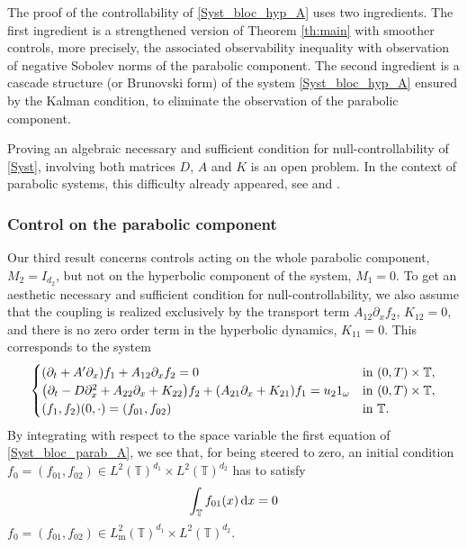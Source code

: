 \documentclass[10pt]{amsart}
\theoremstyle{plain}
\theoremstyle{definition}
\theoremstyle{remark}
\newcommand{\diff}[1][-3]{\ensuremath{\mathop{}\mkern#1mu\mathrm{d}}}
\newcommand{\set}{\mathbb}
\newcommand{\T}{\set{T}}
\newcommand{\m}{{\mathrm m}}
\let\originalleft\left
\let\originalright\right
\renewcommand{\left}{\mathopen{}\mathclose\bgroup\originalleft}
\renewcommand{\right}{\aftergroup\egroup\originalright}
\begin{document}
The proof of the controllability of \eqref{Syst_bloc_hyp_A} uses two ingredients. The first ingredient is a strengthened version of Theorem \ref{th:main} with smoother controls, more precisely, the associated observability inequality with observation of negative Sobolev norms of the parabolic component. The second ingredient is a cascade structure (or Brunovski form) of the system \eqref{Syst_bloc_hyp_A} ensured by the Kalman condition, to eliminate the observation of the parabolic component.

Proving an algebraic necessary and sufficient condition for null-controllability of \eqref{Syst}, involving both matrices $D$, $A$ and $K$ is an open problem.
In the context of parabolic systems, this difficulty already appeared, see
\cite{ammarkhodja_2009} and \cite{duprez_2016a}.

\subsubsection{Control on the parabolic component}

Our third result concerns controls acting on the whole parabolic component, $M_2=I_{d_2}$, but not on the hyperbolic component of the system, $M_1=0$. To get an aesthetic necessary and sufficient condition for null-controllability, we also assume that the coupling is realized exclusively by the transport term $A_{12}\partial_x f_2$, \ie $K_{12}=0$, and there is no zero order term in the hyperbolic dynamics, \ie $K_{11}=0$. This corresponds to the system
\begin{equation} \label{Syst_bloc_parab_A}
\begin{cases}
\left(\partial_t +A'\partial_x \right)f_1+ A_{12}\partial_x f_2= 0
&\text{in}\ (0,T)\times \T,\\
\left(\partial_t - D \partial_x^2+A_{22}\partial_x+K_{22}\right)f_2 + (A_{21}\partial_x + K_{21}) f_1 = u_2 1_\omega &\text{in}\ (0,T)\times \T,\\
(f_1,f_2)(0,\cdot)=(f_{01},f_{02}) & \text{in}\ \T.
\end{cases}
\end{equation}
By integrating with respect to the space variable the first equation of \eqref{Syst_bloc_parab_A}, we see that, for being steered to zero, an initial condition $f_0=(f_{01},f_{02})\in L^2(\T)^{d_1} \times L^2(\T)^{d_2}$ has to satisfy
\begin{equation} \label{Hyp_A_contrainte_parab}
\int_{\T} f_{01}(x) \diff x =0
\end{equation}
\ie $f_0=(f_{01},f_{02})\in L^2_\m(\T)^{d_1} \times L^2(\T)^{d_2}$.
\end{document}
